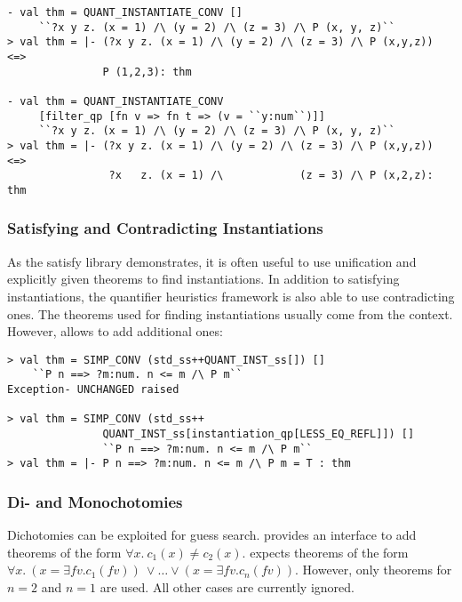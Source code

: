 \begin{session}
\begin{verbatim}
- val thm = QUANT_INSTANTIATE_CONV []
     ``?x y z. (x = 1) /\ (y = 2) /\ (z = 3) /\ P (x, y, z)``
> val thm = |- (?x y z. (x = 1) /\ (y = 2) /\ (z = 3) /\ P (x,y,z)) <=>
               P (1,2,3): thm

- val thm = QUANT_INSTANTIATE_CONV
     [filter_qp [fn v => fn t => (v = ``y:num``)]]
     ``?x y z. (x = 1) /\ (y = 2) /\ (z = 3) /\ P (x, y, z)``
> val thm = |- (?x y z. (x = 1) /\ (y = 2) /\ (z = 3) /\ P (x,y,z)) <=>
                ?x   z. (x = 1) /\            (z = 3) /\ P (x,2,z): thm
\end{verbatim}
\end{session}

\subsubsection{Satisfying and Contradicting Instantiations}

As the satisfy library demonstrates, it is often
useful to use unification and explicitly given theorems to
find instantiations. In addition to satisfying instantiations, the quantifier heuristics framework
is also able to use contradicting ones. The theorems used for finding instantiations usually come from
the context. However,  allows to add additional ones:

\begin{session}
\begin{verbatim}
> val thm = SIMP_CONV (std_ss++QUANT_INST_ss[]) []
    ``P n ==> ?m:num. n <= m /\ P m``
Exception- UNCHANGED raised

> val thm = SIMP_CONV (std_ss++
               QUANT_INST_ss[instantiation_qp[LESS_EQ_REFL]]) []
               ``P n ==> ?m:num. n <= m /\ P m``
> val thm = |- P n ==> ?m:num. n <= m /\ P m = T : thm
\end{verbatim}
\end{session}

\subsubsection{Di- and Monochotomies}

Dichotomies can be exploited for guess search.
 provides an interface to add theorems
of the form $\forall x.\ c_1(x) \neq c_2(x)$.
 expects theorems of the form
$\forall x. \ (x = \exists \textit{fv}. c_1(\textit{fv}))\ \vee \ldots \vee (x = \exists \textit{fv}. c_n(\textit{fv}))$.
However, only theorems for $n = 2$ and $n = 1$ are used. All other cases are currently ignored.

